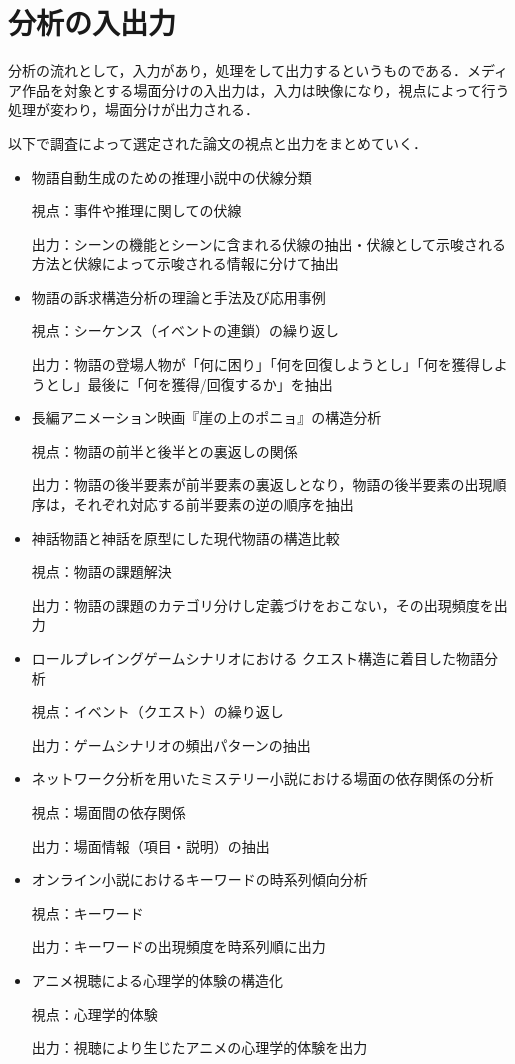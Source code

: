 \section{分析の入出力}
分析の流れとして，入力があり，処理をして出力するというものである．メディア作品を対象とする場面分けの入出力は，入力は映像になり，視点によって行う処理が変わり，場面分けが出力される．

以下で調査によって選定された論文の視点と出力をまとめていく．
\begin{itemize}
\item
物語自動生成のための推理小説中の伏線分類\cite{suiri}

視点：事件や推理に関しての伏線

出力：シーンの機能とシーンに含まれる伏線の抽出・伏線として示唆される方法と伏線によって示唆される情報に分けて抽出
\item
物語の訴求構造分析の理論と手法及び応用事例

視点：シーケンス（イベントの連鎖）の繰り返し

出力：物語の登場人物が「何に困り」「何を回復しようとし」「何を獲得しようとし」最後に「何を獲得/回復するか」を抽出
\item
長編アニメーション映画『崖の上のポニョ』の構造分析

視点：物語の前半と後半との裏返しの関係

出力：物語の後半要素が前半要素の裏返しとなり，物語の後半要素の出現順序は，それぞれ対応する前半要素の逆の順序を抽出
\item
神話物語と神話を原型にした現代物語の構造比較\cite{sinwa}

視点：物語の課題解決

出力：物語の課題のカテゴリ分けし定義づけをおこない，その出現頻度を出力
\item
ロールプレイングゲームシナリオにおける クエスト構造に着目した物語分析\cite{rpg}

視点：イベント（クエスト）の繰り返し

出力：ゲームシナリオの頻出パターンの抽出
\item
ネットワーク分析を用いたミステリー小説における場面の依存関係の分析\cite{misuteri}

視点：場面間の依存関係

出力：場面情報（項目・説明）の抽出
\item
オンライン小説におけるキーワードの時系列傾向分析\cite{onrain}

視点：キーワード

出力：キーワードの出現頻度を時系列順に出力
\item
アニメ視聴による心理学的体験の構造化\cite{anime}

視点：心理学的体験

出力：視聴により生じたアニメの心理学的体験を出力
\end{itemize}
